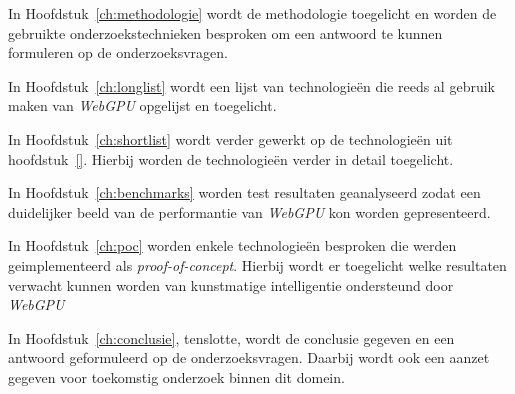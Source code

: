 \bigbreak{}

In Hoofdstuk~\ref{ch:methodologie} wordt de methodologie toegelicht en worden de gebruikte onderzoekstechnieken besproken om een antwoord te kunnen formuleren op de onderzoeksvragen.

\bigbreak{}

In Hoofdstuk~\ref{ch:longlist} wordt een lijst van technologieën die reeds al gebruik maken van \textit{WebGPU} opgelijst en toegelicht.

\bigbreak{}

In Hoofdstuk~\ref{ch:shortlist} wordt verder gewerkt op de technologieën uit hoofdstuk~\ref{}. Hierbij worden de technologieën verder in detail toegelicht.

\bigbreak{}

In Hoofdstuk~\ref{ch:benchmarks} worden test resultaten geanalyseerd zodat een duidelijker beeld van de performantie van \textit{WebGPU} kon worden gepresenteerd.

\bigbreak{}

In Hoofdstuk~\ref{ch:poc} worden enkele technologieën besproken die werden geimplementeerd als \textit{proof-of-concept}. Hierbij wordt er toegelicht welke resultaten verwacht kunnen worden van kunstmatige intelligentie ondersteund door \textit{WebGPU}

\bigbreak{}

In Hoofdstuk~\ref{ch:conclusie}, tenslotte, wordt de conclusie gegeven en een antwoord geformuleerd op de onderzoeksvragen. Daarbij wordt ook een aanzet gegeven voor toekomstig onderzoek binnen dit domein.
